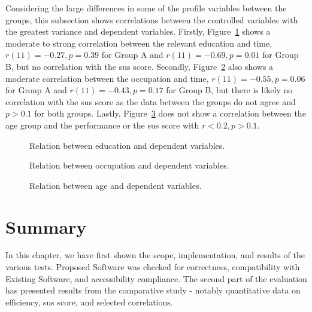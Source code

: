 Considering the large differences in some of the profile variables between the groups, this subsection shows correlations between the controlled variables with the greatest variance and dependent variables.
Firstly, Figure~\ref{fig:plot-correlation-education} shows a moderate to strong correlation between the relevant education and time, $r(11) = -0.27, p = 0.39$ for Group A and $r(11) = -0.69, p = 0.01$ for Group B, but no correlation with the \gls{sus} score.
Secondly, Figure~\ref{fig:plot-correlation-occupation} also shows a moderate correlation between the occupation and time, $r(11) = -0.55, p = 0.06$ for Group A and $r(11) = -0.43, p = 0.17$ for Group B, but there is likely no correlation with the \gls{sus} score as the data between the groups do not agree and $p > 0.1$ for both groups.
Lastly, Figure~\ref{fig:plot-correlation-age} does not show a correlation between the age group and the performance or the \gls{sus} score with $r < 0.2, p > 0.1$.

\begin{figure}[H]
    
    \caption{Relation between education and dependent variables.}
    \label{fig:plot-correlation-education}
\end{figure}

\begin{figure}[H]
    
    \caption{Relation between occupation and dependent variables.}
    \label{fig:plot-correlation-occupation}
\end{figure}

\begin{figure}[H]
    
    \caption{Relation between age and dependent variables.}
    \label{fig:plot-correlation-age}
\end{figure}

\section{Summary}

In this chapter, we have first shown the scope, implementation, and results of the various tests.
Proposed Software was checked for correctness, compatibility with Existing Software, and accessibility compliance.
The second part of the evaluation has presented results from the comparative study - notably quantitative data on efficiency, \gls{sus} score, and selected correlations.
